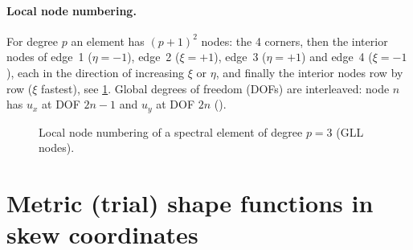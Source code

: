 \paragraph{Local node numbering.}
For degree $p$ an element has $(p+1)^2$ nodes: the 4 corners, then the interior
nodes of edge~1 ($\eta=-1$), edge~2 ($\xi=+1$), edge~3 ($\eta=+1$) and edge~4
($\xi=-1$), each in the direction of increasing $\xi$ or $\eta$, and finally the
interior nodes row by row ($\xi$ fastest), see \cref{fig:nodes}. Global degrees
of freedom (DOFs) are interleaved: node $n$ has $u_x$ at DOF $2n-1$ and $u_y$ at DOF
$2n$ ().

\begin{figure}[htbp]
  \centering
  
  \caption{Local node numbering of a spectral element of degree $p=3$ (GLL nodes).}
  \label{fig:nodes}
\end{figure}

\section{Metric (trial) shape functions in skew coordinates}

